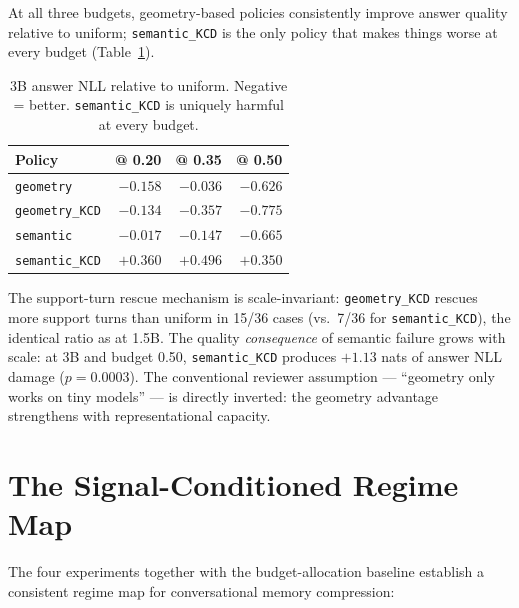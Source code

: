 \documentclass[conference]{IEEEtran}
\begin{document}
At all three budgets, geometry-based policies consistently improve answer
quality relative to uniform; \texttt{semantic\_KCD} is the only policy that
makes things worse at every budget (Table~\ref{tab:3b_nll}).

\begin{table}[t]
  \centering
  \caption{3B answer NLL relative to uniform. Negative = better.
  \texttt{semantic\_KCD} is uniquely harmful at every budget.}
  \label{tab:3b_nll}
  \begin{tabular}{lrrr}
    \toprule
    Policy & @ 0.20 & @ 0.35 & @ 0.50 \\
    \midrule
    \texttt{geometry}     & $-0.158$ & $-0.036$ & $-0.626$ \\
    \texttt{geometry\_KCD} & $-0.134$ & $-0.357$ & $-0.775$ \\
    \texttt{semantic}     & $-0.017$ & $-0.147$ & $-0.665$ \\
    \texttt{semantic\_KCD} & $\mathbf{+0.360}$ & $\mathbf{+0.496}$ & $+0.350$ \\
    \bottomrule
  \end{tabular}
\end{table}

The support-turn rescue mechanism is scale-invariant: \texttt{geometry\_KCD}
rescues more support turns than uniform in 15/36 cases (vs.\ 7/36 for
\texttt{semantic\_KCD}), the identical ratio as at 1.5B. The quality
\emph{consequence} of semantic failure grows with scale: at 3B and budget 0.50,
\texttt{semantic\_KCD} produces $+1.13$ nats of answer NLL damage ($p{=}0.0003$).
The conventional reviewer assumption --- ``geometry only works on tiny models'' ---
is directly inverted: the geometry advantage strengthens with representational
capacity.

\section{The Signal-Conditioned Regime Map}
\label{sec:regime}

The four experiments together with the budget-allocation baseline establish a
consistent regime map for conversational memory compression:
\end{document}
